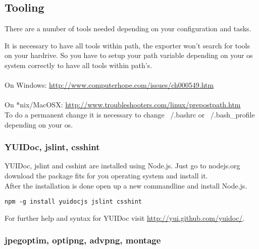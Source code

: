 \subsection{Tooling}
There are a number of tools needed depending on your configuration and tasks.\\

\begin{itemize}
\end{itemize}

\noindent It is necessary to have all tools within path, the exporter won't search for tools on your hardrive. So you have to setup your path variable depending on your os system correctly to have all tools within path's.\\
\\
On Windows: \url{http://www.computerhope.com/issues/ch000549.htm}\\
\\
On *nix/MacOSX: \url{http://www.troubleshooters.com/linux/prepostpath.htm}\\
To do a permanent change it is necessary to change ~/.bashrc or ~/.bash\_profile depending on your os.

\subsubsection{YUIDoc, jslint, csshint}
YUIDoc, jslint and csshint are installed using Node.js. Just go to nodejs.org download the package fits for you operating system and install it. \\
After the installation is done open up a new commandline and install Node.js.

\begin{verbatim}
npm -g install yuidocjs jslint csshint
\end{verbatim}

\noindent For further help and syntax for YUIDoc visit \url{http://yui.github.com/yuidoc/}.


\subsubsection{jpegoptim, optipng, advpng, montage}

